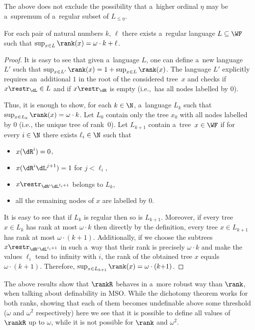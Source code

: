 The above  does not exclude the
possibility that a~higher ordinal $\eta$ may be a~supremum of a~regular
subset of $L_{\leq\eta}$.

\begin{lem}\label{lem:construct-ordinals}
	For each pair of natural numbers $k$, $\ell$ there exists a~regular language $L\subseteq\WF$ such that $\sup_{x\in L} \rank(x)=\omega\cdot k+\ell$.
\end{lem}

\begin{proof}
	It is easy to see that given a~language $L$, one can define a~new language $L'$ such that $\sup_{x\in L'}\rank(x)=1+\sup_{x\in L}\rank(x)$.
	The language $L'$ explicitly requires an~additional $1$ in the root of the considered tree~$x$ and checks if $x\restr_\dL\in L$ and if $x\restr_\dR$ is empty (i.e.,~has all nodes labelled by $0$).

	Thus, it is enough to show, for each $k\in\N$, a~language $L_k$ such that $\sup_{x\in L_k}\rank(x)=\omega\cdot k$.
	Let $L_0$ contain only the tree $x_0$ with all nodes labelled by $0$ (i.e., the unique tree of rank~$0$).
	Let $L_{k+1}$ contain a~tree~$x\in \WF$ if for every $i\in\N$ there exists $\ell_i\in\N$ such that
	\begin{itemize}
	\item $x(\dR^i)=0$,
	\item $x(\dR^i\dL^{j+1})=1$ for $j<\ell_i$,
	\item $x\restr_{\dR^i\dL^{\ell_i+1}}$ belongs to $L_k$,
	\item all the remaining nodes of $x$ are labelled by $0$.
	\end{itemize}
	It is easy to see that if $L_k$ is regular then so is $L_{k+1}$.
	Moreover, if every tree $x\in L_k$ has rank at most $\omega\cdot k$ then directly by the definition, every tree $x\in L_{k+1}$ has rank at most $\omega\cdot (k{+}1)$.
	Additionally, if we choose the subtrees $x\restr_{\dR^i\dL^{\ell_i+1}}$ in such a~way that their rank is precisely $\omega\cdot k$ and make the values $\ell_i$ tend to infinity with $i$,
	the rank of the obtained tree $x$ equals $\omega\cdot (k{+}1)$.
	Therefore, $\sup_{x\in L_{k+1}}\rank(x)=\omega\cdot (k{+}1)$.
\end{proof}

The above results show that $\rankR$ behaves in a~more robust way than $\rank$, when talking about definability in MSO.
While the dichotomy theorem works for both ranks, showing that each of them becomes undefinable above some threshold ($\omega$ and $\omega^2$ respectively)
here we see that it is possible to define all values of $\rankR$ up to $\omega$, while it is not possible for $\rank$ and $\omega^2$.

